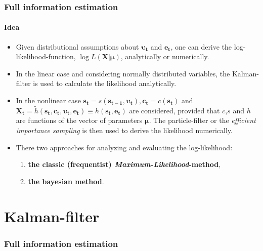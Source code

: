 \documentclass{beamer} %
\begin{document}
\begin{frame}\frametitle{Full information estimation}\framesubtitle{Idea}
  \begin{itemize}
    \item Given distributional assumptions about $\boldsymbol{\upsilon_t}$ and $\mathbf{e_t}$, one can derive the log-likelihood-function, $\log{L(\mathbf{X}|\boldsymbol{\mu})}$, analytically or numerically.
    \item In the linear case and considering normally distributed variables, the Kalman-filter is used to calculate the likelihood analytically.
    \item In the nonlinear case $\mathbf{s_t}=s(\mathbf{s_{t-1}},\boldsymbol{\upsilon_t}), \mathbf{c_t} = c(\mathbf{s_t})$ and $\mathbf{X_t} =\widetilde{h}(\mathbf{s_t},\mathbf{c_t},\boldsymbol{\upsilon_t}, \mathbf{e_t})\equiv h(\mathbf{s_t},\mathbf{e_t})$ are considered, provided that $c$,$s$ and $h$ are functions of the vector of parameters $\boldsymbol{\mu}$. The particle-filter or the \emph{efficient importance sampling} is then used to derive the likelihood numerically.
    \item There two approaches for analyzing and evaluating the log-likelihood:
    \begin{enumerate}
      \item \textbf{the classic (frequentist) \emph{Maximum-Likelihood}-method},
      \item \textbf{the bayesian method}.
    \end{enumerate}
  \end{itemize}
\end{frame}

\section{Kalman-filter}
\begin{frame}\frametitle{Full information estimation}
  \tableofcontents[currentsection]
\end{frame}
\end{document}

